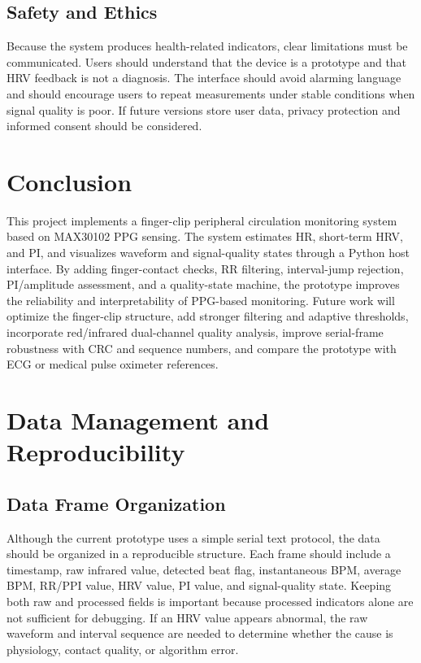 \documentclass[10pt,conference]{IEEEtran}
\begin{document}
\subsection{Safety and Ethics}
Because the system produces health-related indicators, clear limitations must be communicated. Users should understand that the device is a prototype and that HRV feedback is not a diagnosis. The interface should avoid alarming language and should encourage users to repeat measurements under stable conditions when signal quality is poor. If future versions store user data, privacy protection and informed consent should be considered.

\section{Conclusion}
This project implements a finger-clip peripheral circulation monitoring system based on MAX30102 PPG sensing. The system estimates HR, short-term HRV, and PI, and visualizes waveform and signal-quality states through a Python host interface. By adding finger-contact checks, RR filtering, interval-jump rejection, PI/amplitude assessment, and a quality-state machine, the prototype improves the reliability and interpretability of PPG-based monitoring. Future work will optimize the finger-clip structure, add stronger filtering and adaptive thresholds, incorporate red/infrared dual-channel quality analysis, improve serial-frame robustness with CRC and sequence numbers, and compare the prototype with ECG or medical pulse oximeter references.

\section{Data Management and Reproducibility}
\subsection{Data Frame Organization}
Although the current prototype uses a simple serial text protocol, the data should be organized in a reproducible structure. Each frame should include a timestamp, raw infrared value, detected beat flag, instantaneous BPM, average BPM, RR/PPI value, HRV value, PI value, and signal-quality state. Keeping both raw and processed fields is important because processed indicators alone are not sufficient for debugging. If an HRV value appears abnormal, the raw waveform and interval sequence are needed to determine whether the cause is physiology, contact quality, or algorithm error.
\end{document}
